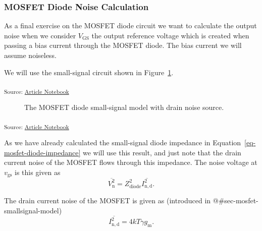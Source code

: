 \documentclass[
  a4paper,
  DIV=11,
  numbers=noendperiod]{scrartcl}
\begin{document}
\subsubsection{MOSFET Diode Noise
Calculation}\label{mosfet-diode-noise-calculation}

As a final exercise on the MOSFET diode circuit we want to calculate the
output noise when we consider \(V_\mathrm{GS}\) the output reference
voltage which is created when passing a bias current through the MOSFET
diode. The bias current we will assume noiseless.

We will use the small-signal circuit shown in
Figure~\ref{fig-mosfet-diode-small-signal-w-noise}.

\textsubscript{Source:
\href{https://iic-jku.github.io/analog-circuit-design/index.qmd.html}{Article
Notebook}}

\begin{figure}[H]


\caption{\label{fig-mosfet-diode-small-signal-w-noise}The MOSFET diode
small-signal model with drain noise source.}

\end{figure}%

\textsubscript{Source:
\href{https://iic-jku.github.io/analog-circuit-design/index.qmd.html}{Article
Notebook}}

As we have already calculated the small-signal diode impedance in
Equation~\ref{eq-mosfet-diode-impedance} we will use this result, and
just note that the drain current noise of the MOSFET flows through this
impedance. The noise voltage at \(v_\mathrm{gs}\) is this given as \[
\overline{V_\mathrm{n}^2} = Z_\mathrm{diode}^2 \overline{I_\mathrm{n,d}^2}.
\]

The drain current noise of the MOSFET is given as (introduced in
@\#sec-mosfet-smallsignal-model) \[
\overline{I_\mathrm{n,d}^2} = 4 k T \gamma g_\mathrm{m}.
\]
\end{document}
